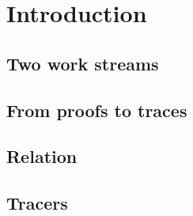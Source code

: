 \newcommand{\alexV}                {\red{\texttt{@Alex.Vlasov}}}
\newcommand{\joanneF}              {\red{\texttt{@Joanne.Fuller}}}
\newcommand{\olivierB}             {\red{\texttt{@Olivier.Bégassat}}}
\newcommand{\franklinD}            {\red{\texttt{@Franklin.Delehelle}}}
\newcommand{\francoisB}            {\red{\texttt{@François.Bojarski}}}
\newcommand{\lorenzoG}             {\red{\texttt{@Lorenzo.Gentile}}}

\newcommand{\prover}               {\texttt{Prover}}
\newcommand{\corset}               {\texttt{Corset}}
\newcommand{\go}                   {\texttt{Go}}
\newcommand{\python}               {\texttt{Python}}
\newcommand{\rust}                 {\texttt{Rust}}
\newcommand{\coq}                  {\texttt{Coq}}
\newcommand{\isbell}               {\texttt{Isbell}}
\newcommand{\hol}                  {\texttt{HOL}}

\newcommand{\mProver}              {\mathtt{Prover}}
\newcommand{\mCorset}              {\mathtt{Corset}}
\newcommand{\mGo}                  {\mathtt{Go}}
\newcommand{\mPython}              {\mathtt{Python}}
\newcommand{\mRust}                {\mathtt{Rust}}
\newcommand{\mCoq}                 {\mathtt{Coq}}
\newcommand{\mIsbell}              {\mathtt{Isbell}}
\newcommand{\mHol}                 {\mathtt{HOL}}

\section{Introduction}
\subsection{Two work streams}                                                                     \label{formal: intro}
\subsection{From proofs to traces}                                                     \label{formal: proofs_to_traces}
\subsection{Relation}                                                                          \label{formal: relation}
\subsection{Tracers}                                                                            \label{formal: tracers}
